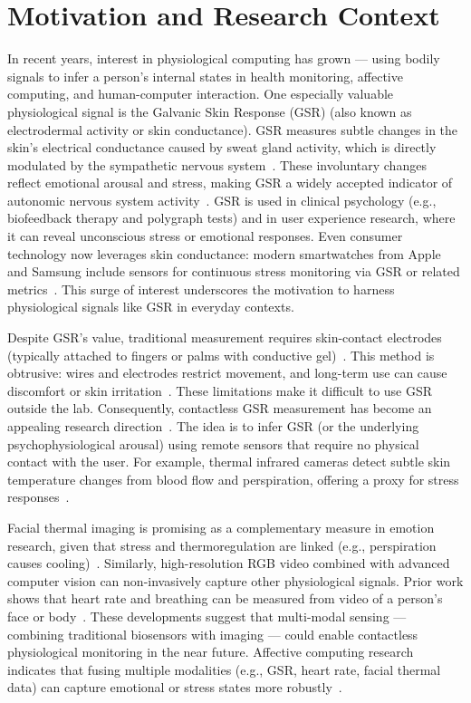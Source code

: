 \section{Motivation and Research Context}

In recent years, interest in physiological computing has grown --- using bodily signals to infer a person's internal states in health monitoring, affective computing, and human-computer interaction. One especially valuable physiological signal is the Galvanic Skin Response (GSR) (also known as electrodermal activity or skin conductance). GSR measures subtle changes in the skin's electrical conductance caused by sweat gland activity, which is directly modulated by the sympathetic nervous system~\cite{boucsein2012electrodermal}. These involuntary changes reflect emotional arousal and stress, making GSR a widely accepted indicator of autonomic nervous system activity~\cite{boucsein2012electrodermal}. GSR is used in clinical psychology (e.g., biofeedback therapy and polygraph tests) and in user experience research, where it can reveal unconscious stress or emotional responses. Even consumer technology now leverages skin conductance: modern smartwatches from Apple and Samsung include sensors for continuous stress monitoring via GSR or related metrics~\cite{neuralsense2025}. This surge of interest underscores the motivation to harness physiological signals like GSR in everyday contexts.

Despite GSR's value, traditional measurement requires skin-contact electrodes (typically attached to fingers or palms with conductive gel)~\cite{jangra2021galvanic}. This method is obtrusive: wires and electrodes restrict movement, and long-term use can cause discomfort or skin irritation~\cite{jangra2021galvanic}. These limitations make it difficult to use GSR outside the lab. Consequently, contactless GSR measurement has become an appealing research direction~\cite{chen2019neural}. The idea is to infer GSR (or the underlying psychophysiological arousal) using remote sensors that require no physical contact with the user. For example, thermal infrared cameras detect subtle skin temperature changes from blood flow and perspiration, offering a proxy for stress responses~\cite{zhang2021human}.

Facial thermal imaging is promising as a complementary measure in emotion research, given that stress and thermoregulation are linked (e.g., perspiration causes cooling)~\cite{zhang2021human}. Similarly, high-resolution RGB video combined with advanced computer vision can non-invasively capture other physiological signals. Prior work shows that heart rate and breathing can be measured from video of a person's face or body~\cite{rti2025thermal}. These developments suggest that multi-modal sensing --- combining traditional biosensors with imaging --- could enable contactless physiological monitoring in the near future. Affective computing research indicates that fusing multiple modalities (e.g., GSR, heart rate, facial thermal data) can capture emotional or stress states more robustly~\cite{boucsein2012electrodermal}.

